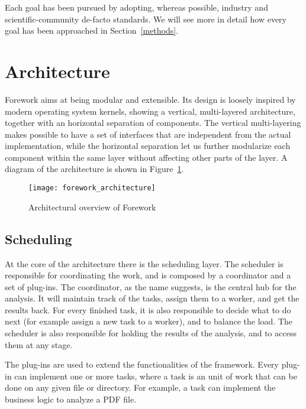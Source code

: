 \documentclass[twoside]{article}
\begin{document}
\begin{multicols}{2}
    Each goal has been pursued by adopting, whereas possible, industry and
    scientific-community de-facto standards. We will see more in detail how
    every goal has been approached in Section~\ref{methods}.



\section{Architecture}

Forework aims at being modular and extensible. Its design is loosely inspired by
modern operating system kernels, showing a vertical, multi-layered architecture,
together with an horizontal separation of components. The vertical multi-layering
makes possible to have a set of interfaces that are independent from the actual
implementation, while the horizontal separation let us further modularize each
component within the same layer without affecting other parts of the layer. A
diagram of the architecture is shown in Figure~\ref{fig:forework_architecture}.

\begin{figure}[H]
    \centering
    \texttt{[image: forework\_architecture]}
    \caption{Architectural overview of Forework}
    \label{fig:forework_architecture}
\end{figure}

\subsection*{Scheduling}

At the core of the architecture there is the scheduling layer. The scheduler is
responsible for coordinating the work, and is composed by a coordinator and a set
of plug-ins.
The coordinator, as the name suggests, is the central hub for the analysis.
It will maintain track of the tasks, assign them to a worker, and get the
results back. For every finished task, it is also responsible to decide what to
do next (for example assign a new task to a worker), and to balance the load.
The scheduler is also responsible for holding the
results of the analysis, and to access them at any stage.

The plug-ins are used to extend the functionalities of the framework. Every
plug-in can implement one or more tasks, where a task is an unit of work that
can be done on any given file or directory. For example, a task can implement
the business logic to analyze a PDF file.


\end{multicols}
\end{document}
